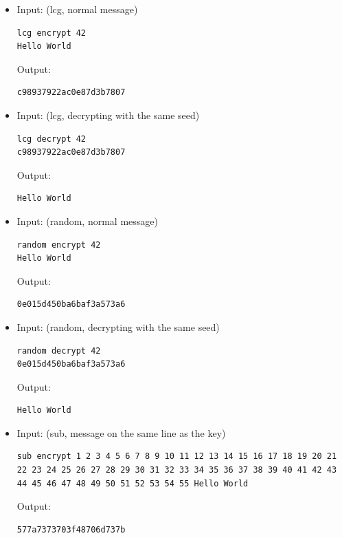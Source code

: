 \documentclass[a4paper,10pt]{article}
\begin{document}
\begin{itemize}
 
\item Input: (lcg, normal message)
\begin{lstlisting}[style = stdio]
lcg encrypt 42
Hello World
\end{lstlisting}
 
  Output:
\begin{lstlisting}[style = stdio]
c98937922ac0e87d3b7807
\end{lstlisting}
 
\item Input: (lcg, decrypting with the same seed)
\begin{lstlisting}[style = stdio]
lcg decrypt 42
c98937922ac0e87d3b7807
\end{lstlisting}
 
  Output:
\begin{lstlisting}[style = stdio]
Hello World
\end{lstlisting}
 
\item Input: (random, normal message)
\begin{lstlisting}[style = stdio]
random encrypt 42
Hello World
\end{lstlisting}
 
  Output:
\begin{lstlisting}[style = stdio]
0e015d450ba6baf3a573a6
\end{lstlisting}
 
\item Input: (random, decrypting with the same seed)
\begin{lstlisting}[style = stdio]
random decrypt 42
0e015d450ba6baf3a573a6
\end{lstlisting}
 
  Output:
\begin{lstlisting}[style = stdio]
Hello World
\end{lstlisting}
 
\item Input: (sub, message on the same line as the key)
\begin{lstlisting}[style = stdio]
sub encrypt 1 2 3 4 5 6 7 8 9 10 11 12 13 14 15 16 17 18 19 20 21 22 23 24 25 26 27 28 29 30 31 32 33 34 35 36 37 38 39 40 41 42 43 44 45 46 47 48 49 50 51 52 53 54 55 Hello World
\end{lstlisting}
 
  Output:
\begin{lstlisting}[style = stdio]
577a7373703f48706d737b
\end{lstlisting}
 

\end{itemize}
\end{document}
